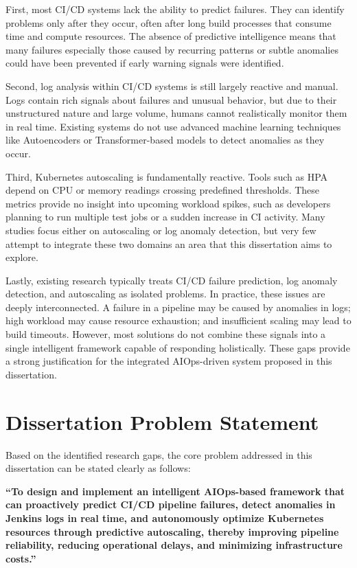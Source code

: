 \documentclass[12pt]{report}
\begin{document}
First, most CI/CD systems lack the ability to predict failures. They can identify problems only after they occur, often after long build processes that consume time and compute resources. The absence of predictive intelligence means that many failures especially those caused by recurring patterns or subtle anomalies could have been prevented if early warning signals were identified.

Second, log analysis within CI/CD systems is still largely reactive and manual. Logs contain rich signals about failures and unusual behavior, but due to their unstructured nature and large volume, humans cannot realistically monitor them in real time. Existing systems do not use advanced machine learning techniques like Autoencoders or Transformer-based models to detect anomalies as they occur.

Third, Kubernetes autoscaling is fundamentally reactive. Tools such as HPA depend on CPU or memory readings crossing predefined thresholds. These metrics provide no insight into upcoming workload spikes, such as developers planning to run multiple test jobs or a sudden increase in CI activity. Many studies focus either on autoscaling or log anomaly detection, but very few attempt to integrate these two domains an area that this dissertation aims to explore.

Lastly, existing research typically treats CI/CD failure prediction, log anomaly detection, and autoscaling as isolated problems. In practice, these issues are deeply interconnected. A failure in a pipeline may be caused by anomalies in logs; high workload may cause resource exhaustion; and insufficient scaling may lead to build timeouts. However, most solutions do not combine these signals into a single intelligent framework capable of responding holistically. These gaps provide a strong justification for the integrated AIOps-driven system proposed in this dissertation.

\section{Dissertation Problem Statement}

Based on the identified research gaps, the core problem addressed in this dissertation can be stated clearly as follows:

\textbf{``To design and implement an intelligent AIOps-based framework that can proactively predict CI/CD pipeline failures, detect anomalies in Jenkins logs in real time, and autonomously optimize Kubernetes resources through predictive autoscaling, thereby improving pipeline reliability, reducing operational delays, and minimizing infrastructure costs.''}
\end{document}
